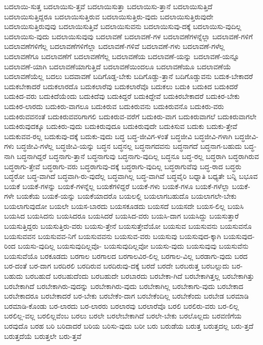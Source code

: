 {ಬದಲಾಯಿ-ಸುತ್ತ
ಬದಲಾಯಿಸು-ತ್ತವೆ
ಬದಲಾಯಿಸುತ್ತಾ
ಬದಲಾಯಿಸು-ತ್ತಾನೆ
ಬದಲಾಯಿಸುತ್ತಿದೆ
ಬದಲಾಯಿಸುತ್ತಿದ್ದರೂ
ಬದಲಾಯಿಸುತ್ತಿರುವ
ಬದಲಾಯಿಸುತ್ತಿರು-ವುದು
ಬದಲಾಯಿಸುತ್ತಿರುವುದೇ
ಬದಲಾಯಿಸುತ್ತಿರುವುವು
ಬದಲಾಯಿಸುತ್ತಿವೆ
ಬದಲಾಯಿಸುವನು
ಬದಲಾಯಿಸುವು-ದಕ್ಕೆ
ಬದಲಾಯಿಸು-ವುದಿಲ್ಲ
ಬದಲಾಯಿಸು-ವುದು
ಬದಲಾಯಿಸುವುವು
ಬದಲಾವಣೆ
ಬದಲಾವಣೆ-ಗಳ
ಬದಲಾವಣೆಗಳನ್ನೆಲ್ಲಾ
ಬದಲಾವಣೆ-ಗಳಿಗೆ
ಬದಲಾವಣೆಗಳಿಗೆಲ್ಲ
ಬದಲಾವಣೆಗಳಿಗೆಲ್ಲಾ
ಬದಲಾವಣೆ-ಗಳಿವೆ
ಬದಲಾವಣೆ-ಗಳು
ಬದಲಾವಣೆ-ಗಳೆಲ್ಲ
ಬದಲಾವಣೆಗೂ
ಬದಲಾವಣೆಗೆ
ಬದಲಾವಣೆಗೆಲ್ಲ
ಬದಲಾವಣೆಯ
ಬದಲಾವಣೆ-ಯನ್ನು
ಬದಲಾವಣೆ-ಯನ್ನೂ
ಬದಲಾವಣೆ-ಯಾಗಿ
ಬದಲಾವಣೆಯಾಗುತ್ತಿದೆ
ಬದಲಾವಣೆಯಿಂದಲೂ
ಬದಲಾವಣೆಯೂ
ಬದಲಾವಣೆಯೆ
ಬದಲಾವಣೆಯೆಲ್ಲ
ಬದಲು
ಬದವಾವಣೆ
ಬದಿಗೊಡ್ಡ-ಬೇಕು
ಬದಿಗೊಡ್ಡು-ತ್ತಾನೆ
ಬದಿಗೊಡ್ಡುವನು
ಬದುಕ-ಬೇಕಾದರೆ
ಬದುಕಬೇಕಾದರೆ
ಬದುಕಲಾರದೊ
ಬದುಕಲಾರೆವು
ಬದುಕಲಾರೆವೊ
ಬದುಕಲು
ಬದುಕಿ
ಬದುಕಿದ
ಬದುಕಿದರೆ
ಬದುಕಿದ-ವರು
ಬದುಕಿದೆಯೆಂದು
ಬದುಕಿದೆವು
ಬದುಕಿದ್ದರೆ
ಬದುಕಿದ್ದೇವೆ
ಬದುಕಿರಬೇಕಾದರೆ
ಬದುಕಿರ-ಬೇಕು
ಬದುಕಿರ-ಲಾರದು
ಬದುಕಿರು-ವಾಗಲೂ
ಬದುಕಿರುವ
ಬದುಕಿರುವನು
ಬದುಕಿರುವನೊ
ಬದುಕಿರು-ವರು
ಬದುಕಿರುವವನಂತೆ
ಬದುಕಿರುವವರಿಗಾಗಲಿ
ಬದುಕಿರುವ-ವರೆಗೆ
ಬದುಕಿರು-ವಾಗ
ಬದುಕಿರುವಾಗಲೆ
ಬದುಕಿರುವಾಗಲೇ
ಬದುಕಿರುವುದಕ್ಕೂ
ಬದುಕಿರು-ವುದು
ಬದುಕಿರುವುದೂ
ಬದುಕಿರುವುದೇ
ಬದುಕಿಸುವ
ಬದುಕು
ಬದುಕು-ತ್ತೇವೆ
ಬದುಕುವವ-ರಲ್ಲ
ಬದುಕುವು-ದಕ್ಕೆ
ಬದುಕು-ವುದು
ಬದ್ಧ
ಬದ್ಧ-ಜೀವಿಗ-ಳಂತೆ
ಬದ್ಧಜೀವಿ
ಬದ್ಧಜೀವಿ-ಗಳಾಗಿ
ಬದ್ಧಜೀವಿ-ಗಳು
ಬದ್ಧಜೀವಿ-ಗಳೆಲ್ಲ
ಬದ್ಧಜೀವಿ-ಯನ್ನು
ಬದ್ಧನ
ಬದ್ಧನಲ್ಲ
ಬದ್ಧನಾಗದವನು
ಬದ್ಧನಾಗದೆ
ಬದ್ಧನಾಗ-ಬಹುದು
ಬದ್ಧ-ನಾಗಿ
ಬದ್ಧನಾಗಿದ್ದರೆ
ಬದ್ಧನಾಗು-ತ್ತಾನೆ
ಬದ್ಧನಾಗುವು
ಬದ್ಧನಾಗು-ವುದಿಲ್ಲ
ಬದ್ಧನೂ
ಬದ್ಧ-ರಲ್ಲ
ಬದ್ಧರಾಗಿ
ಬದ್ಧರಾಗಿರುವ
ಬದ್ಧರಾಗು-ತ್ತೇವೆ
ಬದ್ಧರಾಗು-ವರು
ಬದ್ಧರಾಗುವು-ದಕ್ಕೆ
ಬದ್ಧರಾಗು-ವುದಿಲ್ಲ
ಬದ್ಧರಾಗುವೆವು
ಬದ್ಧ-ರಾದ
ಬದ್ಧರು
ಬದ್ಧರೋ
ಬದ್ಧ-ವಾಗಿದೆ
ಬದ್ಧವಾಗಿ-ರು-ವುದೆಲ್ಲ
ಬದ್ಧವಾಗಿಲ್ಲ
ಬದ್ಧ-ವಾಗಿವೆ
ಬದ್ಧವೈರಿ
ಬಧ್ನಾತಿ
ಬಧ್ಯತೇ
ಬನ್ನಿ
ಬಭೂವ
ಬಯಕೆ
ಬಯಕೆ-ಗಳನ್ನು
ಬಯಕೆ-ಗಳನ್ನೆಲ್ಲ
ಬಯಕೆಗಳಿದ್ದರೆ
ಬಯಕೆ-ಗಳು
ಬಯಕೆ-ಗಳೂ
ಬಯಕೆ-ಗಳೆಲ್ಲಾ
ಬಯಕೆ-ಗಳೇ
ಬಯಕೆಯ
ಬಯಕೆ-ಯನ್ನು
ಬಯಕೆಯಾದರೊ
ಬಯಲಲ್ಲಿ
ಬಯಲಾಗಬಹುದೊ
ಬಯಲಾಗಲೇ-ಬೇಕು
ಬಯಲಾಗುವುದೋ
ಬಯಲೇ
ಬಯಸ-ಬಾರದು
ಬಯಸಕೂಡದು
ಬಯಸದೆ
ಬಯಸದೇ
ಬಯಸ-ಲಿಲ್ಲ
ಬಯಸಿ
ಬಯಸಿದ
ಬಯಸಿದನು
ಬಯಸಿದರೂ
ಬಯಸಿದರೆ
ಬಯಸಿದ-ವರು
ಬಯಸಿ-ದಾಗ
ಬಯಸಿದ್ದು
ಬಯಸುತ್ತಾರೆ
ಬಯಸುತ್ತಿದ್ದರು
ಬಯಸುತ್ತಿರು-ವರು
ಬಯಸು-ತ್ತೇನೆ
ಬಯಸುತ್ತೇವೆಯೋ
ಬಯಸುವ
ಬಯಸುವನು
ಬಯಸುವನೊ
ಬಯಸುವವನ
ಬಯಸುವವ-ನಿಗೆ
ಬಯಸುವವನು
ಬಯಸುವ-ವರು
ಬಯಸುವು
ಬಯಸುವುದ-ಕ್ಕಾಗಿ
ಬಯಸುವುದ-ರಿಂದ
ಬಯಸು-ವುದಿಲ್ಲ
ಬಯಸುವುದಿಲ್ಲವೊ-
ಬಯಸುವುದಿಲ್ಲವೋ
ಬಯಸು-ವುದು
ಬಯಸುವುವು
ಬಯಸುವೆನು
ಬಯಸುವೆಯೊ
ಬರಕೂಡದು
ಬರಗಾಲ
ಬರಗಾಲದ
ಬರಗಾಲವಿರ-ಲಿಲ್ಲ
ಬರಗಾಲ-ವಿಲ್ಲ
ಬರಡಾಗು-ವುದು
ಬರದ
ಬರ-ದಂತೆ
ಬರ-ದಾಗ
ಬರದಿರಲಿ
ಬರದಿರುವ
ಬರದಿರುವು-ದಕ್ಕೆ
ಬರದೆ
ಬರದೇ
ಬರಬರುತ್ತ
ಬರಬಲ್ಲುದು
ಬರ-ಬಹುದು
ಬರಬಹುದೆ
ಬರಬಹುದೆಂದು
ಬರಬಹುದೇ
ಬರಬಾರದು
ಬರಬೇಕಾ-ಗಿದೆ
ಬರಬೇಕಾಗಿತ್ತಲ್ಲ
ಬರಬೇಕಾಗಿತ್ತು
ಬರಬೇಕಾಗಿದೆ
ಬರಬೇಕಾಗಿರು-ವುದನ್ನು
ಬರಬೇಕಾಗಿರು-ವುದು
ಬರಬೇಕಾಗಿಲ್ಲ
ಬರಬೇಕಾಗು-ವುದು
ಬರಬೇಕಾದ
ಬರಬೇಕಾದರೂ
ಬರಬೇಕಾದರೆ
ಬರ-ಬೇಕು
ಬರಬೇಕೆಂ-ದಾಗ
ಬರಬೇಕೆಂದಿಲ್ಲ
ಬರಬೇಕೆಂದು
ಬರಬೇಡ
ಬರಮಾಡಿ
ಬರಮಾಡಿ-ಕೊಂಡು
ಬರ-ಲಾರದು
ಬರ-ಲಾರರು
ಬರಲಾರವು
ಬರಲಾರೆವೊ
ಬರಲಿ
ಬರಲಿರು-ವರು
ಬರ-ಲಿಲ್ಲ
ಬರಲಿಲ್ಲ-ವಲ್ಲ
ಬರಲಿಲ್ಲವೆಂಬ
ಬರಲು
ಬರಲೇ
ಬರಲೇಬೇಕಾಗಿದೆ
ಬರಲೇ-ಬೇಕು
ಬರಲೊಲ್ಲದು
ಬರವಣಿಗೆಯ
ಬರವುದೊ
ಬರಹ
ಬರಿ
ಬರಿದಾದರೆ
ಬರಿಯ
ಬರಿಸು-ವುದು
ಬರೀ
ಬರು
ಬರುಡೆಯ
ಬರುತ್ತ
ಬರುತ್ತದಲ್ಲ
ಬರು-ತ್ತದೆ
ಬರುತ್ತದೆಯೆ
ಬರುತ್ತಲೇ
ಬರು-ತ್ತವೆ
}

